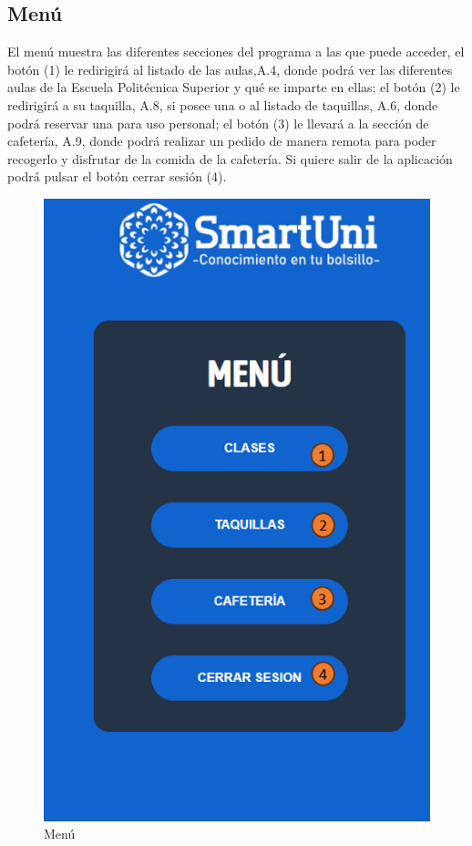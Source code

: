 \documentclass[12pt]{report}
\begin{document}
\begin{appendices}
\section{Menú}
El menú muestra las diferentes secciones del programa a las que puede acceder, el botón (1) le redirigirá al listado de las aulas,A.4, donde podrá ver las diferentes aulas de la Escuela Politécnica Superior y qué se imparte en ellas; el botón (2) le redirigirá a su taquilla, A.8, si posee una o al listado de taquillas, A.6, donde podrá reservar una para uso personal; el botón (3) le llevará a la sección de cafetería, A.9, donde podrá realizar un pedido de manera remota para poder recogerlo y disfrutar de la comida de la cafetería. Si quiere salir de la aplicación podrá pulsar el botón cerrar sesión (4).\\
\begin{figure}[H]
    \centering
    \includegraphics[scale = 0.7]{imagenes//manual_de_usuario/2.png}
    \caption{Menú}
    \label{fig:Figura3.4.3}
\end{figure}
\newpage

\end{appendices}
\end{document}
